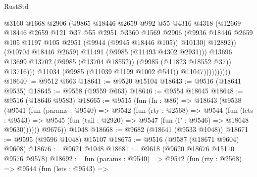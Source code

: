 \begin{lexlean}{RustStd}
\begin{coremodule}
                                @3160
                                @1668
                                @2906
                                (@9865
                                  @18446
                                  @2659
                                  @992
                                  @55
                                  @4316
                                  @4318
                                  (@12669
                                    @18446
                                    @2659
                                    @121
                                    @37
                                    @55
                                    @2951
                                    @3360
                                    @1569
                                    @2906
                                    (@9936
                                      @18446
                                      @2659
                                      @105
                                      @1197
                                      @105
                                      @2951
                                      (@9944 (@9945 @18446 @105))
                                      @10130)
                                    @12892))
                                (@10704 @18446 @2659)
                                @11491
                                (@9985 (@11493 @4302 @2931)))
                              @13696
                              @13699
                              @13702
                              (@9985 (@13704 @18552))
                              (@9985 (@11823 @18552 @37))
                              @13716)))
                        @11034
                        (@9985 (@11039 @1199 @1002 @541))
                        @11047))))))))))
@18640 := @9512 @663
@18641 := @9520 @15104
@18643 := @9516 (@18641 @9535)
@18645 := @9558 (@9559 @663)
@18646 := @9554 @18645
@18648 := @9516 (@18646 @9583)
@18665 := @9515
    (fun (fn : @86) =>
    @18643
      (@9538
        (@9541
          (fun (params : @9540) =>
          @9542
            (fun (rty : @2568) =>
            @9544
              (fun (lets : @9543) =>
              @9545 (fun (tail : @2920) => @9547 (fun (Γ : @9546) => @18648 @9630))))))
        @9676))
    @1048
@18668 := @9682 (@18641 (@9533 @1048))
@18671 := @9595 (@9596 @1048) @15107
@18675 := @9516 (@9587 (@18671 @9604) @9608)
@18676 := @9621 @1048
@18681 := @9618 (@9620 @18676 @15110 @9576 @9578)
@18692 := fun (params : @9540) =>
  @9542
    (fun (rty : @2568) =>
    @9544
      (fun (lets : @9543) =>

\end{coremodule}
\end{lexlean}
